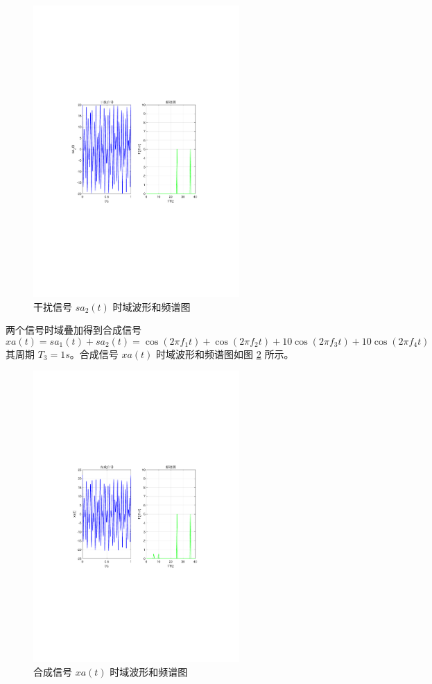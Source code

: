 \documentclass[12pt,AutoFakeBold]{article}
\begin{document}
\begin{figure}[htbp]
	\centering
	\includegraphics[width=0.7\textwidth]{figure/sa2.pdf}
	\caption{干扰信号 $sa_2(t)$ 时域波形和频谱图} \label{fig:sa2}
\end{figure}

两个信号时域叠加得到合成信号
%
\begin{equation}
xa(t)=sa_1(t)+sa_2(t)=\cos(2\pi f_1t)+\cos(2\pi f_2t)+10\cos(2\pi f_3t)+10\cos(2\pi f_4t)
\end{equation}
%
其周期 $T_3=1s$。合成信号 $xa(t)$ 时域波形和频谱图如图 \ref{fig:xa} 所示。

\begin{figure}[htbp]
	\centering
	\includegraphics[width=0.7\textwidth]{figure/xa.pdf}
	\caption{合成信号 $xa(t)$ 时域波形和频谱图} \label{fig:xa}
\end{figure}
\end{document}
